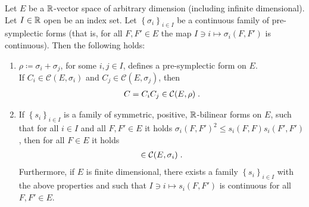 \begin{lemma}\label{lem:on_contiuous_families}
	Let $E$ be a $\mathbb{R}$-vector space of arbitrary dimension (including infinite dimensional). Let $I \in \mathbb{R}$ open be an index set. Let $\left\{ \sigma_i \right\}_{i \in I}$ be a continuous family of pre-symplectic forms (that is, for all $F,F' \in E$ the map $I \ni i \mapsto \sigma_i(F,F')$ is continuous). 
	Then the following holds:
	\begin{enumerate}
		\item $\rho \coloneqq \sigma_i + \sigma_j$, for some $i,j \in I$, defines a pre-symplectic form on $E$. \\If $C_i \in \mathcal{C}(E,\sigma_i)$ and $C_j \in \mathcal{C}(E,\sigma_j)$, then
		\begin{align}
			C = C_i C_j \in \mathcal{C}(E,\rho) \;.
		\end{align}
		\item If $\left\{s_i\right\}_{i \in I}$ is a family of symmetric, positive, $\mathbb{R}$-bilinear forms on $E$, such that for all $i \in I$ and all $F,F' \in E$ it holds $\sigma_i(F,F')^2 \leq s_i(F,F) s_i(F',F')$, then for all $F \in E$ it holds
		\begin{align}
			[F \mapsto \e^{-s_i(F,F)/2}] \in \mathcal{C}(E,\sigma_i)\formspace.
		\end{align}
		Furthermore, if $E$ is finite dimensional, there exists a family $\left\{s_i\right\}_{i \in I}$ with the above properties and such that $I \ni i \mapsto s_i (F,F')$ is continuous for all $F,F' \in E$.
	\end{enumerate}
\end{lemma}
